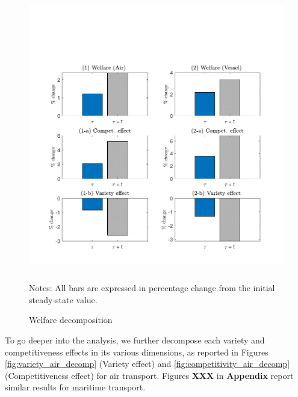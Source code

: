 \documentclass[a4paper,11pt]{article}
\begin{document}
\begin{figure}[htbp]
\caption{Welfare decomposition}
\label{fig:welfare_decomp}
\includegraphics[width=15cm, height=12cm]{Welfare_change_bothmodes.pdf}
\begin{minipage} [t]  {7in} \footnotesize%
Notes: All bars are expressed in percentage change from the initial steady-state value.
\end{minipage}
\end{figure}

To go deeper into the analysis, we further decompose each variety and competitiveness effects in its various dimensions, as reported in Figures \ref{fig:variety_air_decomp} (Variety effect) and \ref{fig:competitivity_air_decomp} (Competitiveness effect) for air transport. Figures \textbf{XXX} in \textbf{Appendix} report similar results for maritime transport.
\end{document}

